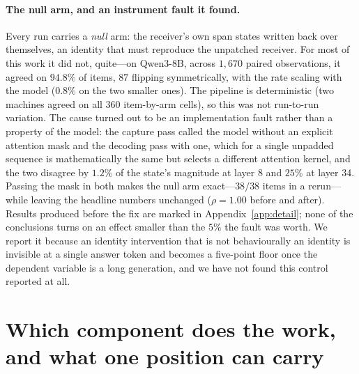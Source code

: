 \documentclass{article}
\begin{document}
\paragraph{The null arm, and an instrument fault it found.} Every run carries a
\emph{null} arm: the receiver's own span states written back over themselves, an
identity that must reproduce the unpatched receiver. For most of this work it
did not, quite---on Qwen3-8B, across $1{,}670$ paired observations, it agreed on
$94.8\%$ of items, $87$ flipping symmetrically, with the rate scaling with the
model ($0.8\%$ on the two smaller ones). The pipeline is deterministic (two
machines agreed on all $360$ item-by-arm cells), so this was not run-to-run
variation. The cause turned out to be an implementation fault rather than a
property of the model: the capture pass called the model without an explicit
attention mask and the decoding pass with one, which for a single unpadded
sequence is mathematically the same but selects a different attention kernel,
and the two disagree by $1.2\%$ of the state's magnitude at layer 8 and $25\%$
at layer 34. Passing the mask in both makes the null arm exact---$38/38$ items
in a rerun---while leaving the headline numbers unchanged ($\rho = 1.00$ before
and after). Results produced before the fix are marked in
Appendix~\ref{app:detail}; none of the conclusions turns on an effect smaller
than the $5\%$ the fault was worth. We report it because an identity
intervention that is not behaviourally an identity is invisible at a single
answer token and becomes a five-point floor once the dependent variable is a
long generation, and we have not found this control reported at all.

\section{Which component does the work, and what one position can carry}
\label{sec:decomp}
\end{document}
